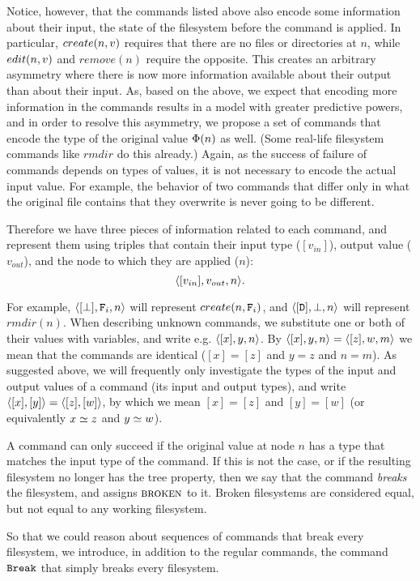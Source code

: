 Notice, however, that the commands listed above also encode some information about 
their input, the state of the filesystem
before the command is applied. In particular, $create(n,v)$ requires that there are no files
or directories at $n$, while $edit(n,v)$ and $remove(n)$ require the opposite.
This creates an arbitrary asymmetry where
there is now more information available about their output than about their input.
As, based on the above, we expect that encoding more information in the commands
results in a model with greater predictive powers,
and in order to resolve this asymmetry, 
we propose a set of commands that encode
the type of the original value $\Phi(n)$ as well.
(Some real-life filesystem commands like $rmdir$ do this already.)
Again, as the success of failure of commands depends on types of values,
it is not necessary to encode the actual input value.
For example, the behavior of two commands that differ only in what the original file contains
that they overwrite is never going to be different.

\begin{mydef}
Therefore we have three pieces of information related to each command,
and represent them using triples that contain
their input type ($[v_{in}]$), output value ($v_{out}$),
and the node to which they are applied ($n$):
\[ \langle{[v_{in}],v_{out},n}\rangle. \]
\end{mydef}

For example, $\langle{[\bot],\mathtt{F}_i,n}\rangle$ will represent $create(n,\mathtt{F}_i)$,
and $\langle{[\mathtt{D}],\bot,n}\rangle$ will represent $rmdir(n)$.
When describing unknown commands, we substitute one or both
of their values with variables, and write e.g. $\langle{[x],y,n}\rangle$.
By $\langle{[x],y,n}\rangle=\langle{[z],w,m}\rangle$ we mean that the commands are identical
($[x]=[z]$ and $y=z$ and $n=m$).
As suggested above, we will frequently only investigate
the types of the input and output values of a command
(its input and output types), and write
$\langle{[x],[y]}\rangle=\langle{[z],[w]}\rangle$, by which we mean $[x]=[z]$ and $[y]=[w]$
(or equivalently $x\simeq z$ and $y\simeq w$).

\bigskip

\noindent
A command can only succeed if the original value at node $n$ has a type that matches
the input type of the command. If this is not the case, or if the resulting
filesystem no longer has the tree property, then we say that the command
{\em breaks} the filesystem, and assigns $\text{\normalfont\scshape{broken}}$ to it.
Broken filesystems are considered equal, but not equal to any working filesystem.

So that we could reason about sequences of commands that break every filesystem, 
we introduce, in addition to the regular commands,
the command $\mathtt{Break}$ that simply breaks every filesystem.


